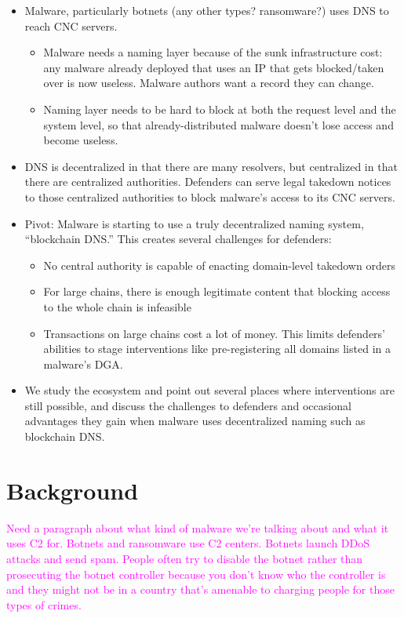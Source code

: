 \documentclass[10pt,sigconf,letterpaper]{acmart}
\newcommand{\randall}{\ding{110}\ding{43}\textcolor{magenta}}
\newcommand{\randall}{}
\begin{document}
\begin{itemize}
	\item Malware, particularly botnets (any other types? ransomware?) 
	uses DNS to reach CNC 
	servers. 
	\begin{itemize}
		\item Malware needs a naming layer because of the 
		sunk infrastructure cost: 
		any malware already deployed that uses an IP that gets blocked/taken 
		over is now useless. Malware authors want a record they can change.
		\item Naming layer needs to be hard to block at both 
		the request level and the system level, so that 
		already-distributed malware doesn't lose access and 
		become useless. 
	\end{itemize}
	\item DNS is decentralized in that there are many resolvers, but 
	centralized in that there are centralized authorities. Defenders can serve 
	legal takedown notices to those centralized authorities to block malware's 
	access to its CNC servers.
	\item Pivot: Malware is starting to use a truly decentralized naming 
	system, ``blockchain DNS.'' This creates several challenges for defenders:
	\begin{itemize}
		\item No central authority is capable of enacting domain-level takedown 
		orders
		\item For large chains, there is enough legitimate content that 
		blocking access to the whole chain is infeasible
		\item Transactions on large chains cost a lot of money. This limits 
		defenders' abilities to stage interventions like pre-registering all 
		domains listed in a malware's DGA.
	\end{itemize}
	\item We study the ecosystem and point out several places where 
	interventions are still possible, and discuss the challenges to defenders 
	and occasional advantages they gain when malware uses decentralized naming 
	such as blockchain DNS.
\end{itemize}

\section{Background}

\randall{Need a paragraph about what kind of malware we're talking about 
and what it uses C2 for.
Botnets and ransomware use C2 centers. Botnets launch DDoS attacks and send 
spam. People often try 
to disable the botnet rather than prosecuting the botnet controller because you 
don't know who the 
controller is and they might not be in a country that's amenable to charging 
people for those types 
of crimes.}
\end{document}
